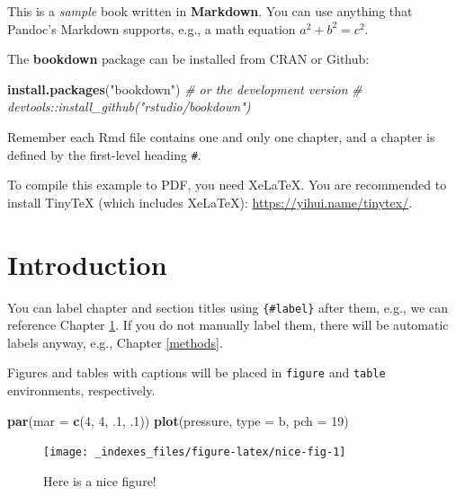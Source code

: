 \documentclass[
]{book}
\newenvironment{Shaded}{\begin{snugshade}}{\end{snugshade}}
\newcommand{\CommentTok}[1]{\textcolor[rgb]{0.56,0.35,0.01}{\textit{#1}}}
\newcommand{\DataTypeTok}[1]{\textcolor[rgb]{0.13,0.29,0.53}{#1}}
\newcommand{\DecValTok}[1]{\textcolor[rgb]{0.00,0.00,0.81}{#1}}
\newcommand{\FloatTok}[1]{\textcolor[rgb]{0.00,0.00,0.81}{#1}}
\newcommand{\KeywordTok}[1]{\textcolor[rgb]{0.13,0.29,0.53}{\textbf{#1}}}
\newcommand{\NormalTok}[1]{#1}
\newcommand{\StringTok}[1]{\textcolor[rgb]{0.31,0.60,0.02}{#1}}
\begin{document}
This is a \emph{sample} book written in \textbf{Markdown}. You can use anything that Pandoc's Markdown supports, e.g., a math equation \(a^2 + b^2 = c^2\).

The \textbf{bookdown} package can be installed from CRAN or Github:

\begin{Shaded}
\begin{Highlighting}[]
\KeywordTok{install.packages}\NormalTok{(}\StringTok{"bookdown"}\NormalTok{)}
\CommentTok{\# or the development version}
\CommentTok{\# devtools::install\_github("rstudio/bookdown")}
\end{Highlighting}
\end{Shaded}

Remember each Rmd file contains one and only one chapter, and a chapter is defined by the first-level heading \texttt{\#}.

To compile this example to PDF, you need XeLaTeX. You are recommended to install TinyTeX (which includes XeLaTeX): \url{https://yihui.name/tinytex/}.

\hypertarget{intro}{%
\chapter{Introduction}\label{intro}}

You can label chapter and section titles using \texttt{\{\#label\}} after them, e.g., we can reference Chapter \ref{intro}. If you do not manually label them, there will be automatic labels anyway, e.g., Chapter \ref{methods}.

Figures and tables with captions will be placed in \texttt{figure} and \texttt{table} environments, respectively.

\begin{Shaded}
\begin{Highlighting}[]
\KeywordTok{par}\NormalTok{(}\DataTypeTok{mar =} \KeywordTok{c}\NormalTok{(}\DecValTok{4}\NormalTok{, }\DecValTok{4}\NormalTok{, }\FloatTok{.1}\NormalTok{, }\FloatTok{.1}\NormalTok{))}
\KeywordTok{plot}\NormalTok{(pressure, }\DataTypeTok{type =} \StringTok{\textquotesingle{}b\textquotesingle{}}\NormalTok{, }\DataTypeTok{pch =} \DecValTok{19}\NormalTok{)}
\end{Highlighting}
\end{Shaded}

\begin{figure}

{\centering \texttt{[image: \_indexes\_files/figure-latex/nice-fig-1]} 

}

\caption{Here is a nice figure!}\label{fig:nice-fig}
\end{figure}
\end{document}
